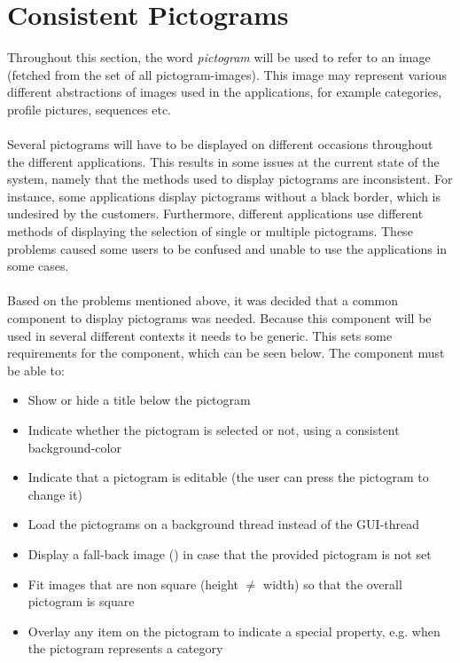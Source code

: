 
\section{Consistent Pictograms}
\label{sec:consistent_pictograms}

Throughout this section, the word \emph{pictogram} will be used to refer to an image (fetched from the set of all pictogram-images). This image may represent various different abstractions of images used in the \giraf applications, for example categories, profile pictures, sequences etc.
\\\\
Several pictograms will have to be displayed on different occasions throughout the different \giraf applications. This results in some issues at the current state of the system, namely that the methods used to display pictograms are inconsistent. For instance, some applications display pictograms without a black border, which is undesired by the customers. Furthermore, different applications use different methods of displaying the selection of single or multiple pictograms. These problems caused some users to be confused and unable to use the applications in some cases. 
\\\\
Based on the problems mentioned above, it was decided that a common component to display pictograms was needed. Because this component will be used in several different contexts it needs to be generic. This sets some requirements for the component, which can be seen below. The component must be able to:

\begin{itemize}
	\item Show or hide a title below the pictogram
	\item Indicate whether the pictogram is selected or not, using a consistent background-color
	\item Indicate that a pictogram is editable (the user can press the pictogram to change it)
	\item Load the pictograms on a background thread instead of the GUI-thread 
	\item Display a fall-back image () in case that the provided pictogram is not set
	\item Fit images that are non square (height $\neq$ width) so that the overall pictogram is square
	\item Overlay any item on the pictogram to indicate a special property, e.g. when the pictogram represents a category
\end{itemize}

